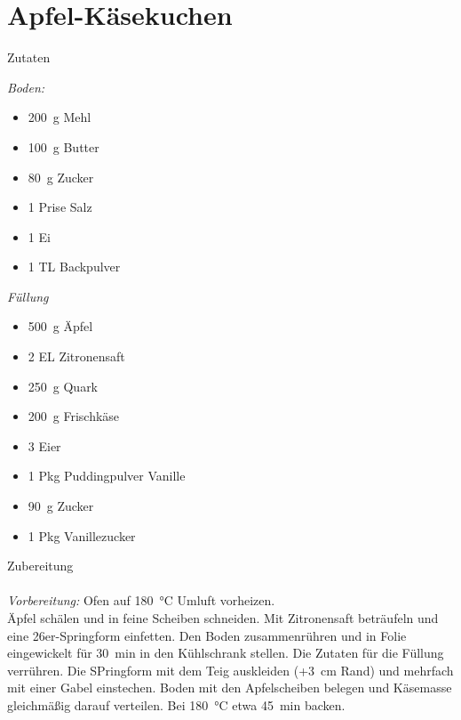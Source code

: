 \section*{Apfel-Käsekuchen}
\ihead{}\ohead{}
\cfoot{}
{\Large Zutaten}
\begin{multicols}{2}
\textit{Boden:}
\begin{itemize}
    \item \SI{200}{g} Mehl
    \item \SI{100}{g} Butter
    \item \SI{80}{g} Zucker
    \item \num{1} Prise Salz
    \item \num{1} Ei
    \item \num{1} TL Backpulver
\end{itemize}
\columnbreak
\textit{Füllung}
\begin{itemize}
    \item \SI{500}{g} Äpfel
    \item \num{2} EL Zitronensaft
    \item \SI{250}{g} Quark
    \item \SI{200}{g} Frischkäse
    \item \num{3} Eier
    \item \num{1} Pkg Puddingpulver Vanille
    \item \SI{90}{g} Zucker
    \item \num{1} Pkg Vanillezucker
\end{itemize}
\end{multicols}
\noindent
{\Large Zubereitung}\\
\\
\textit{Vorbereitung:} Ofen auf \SI{180}{\celsius} Umluft vorheizen.\\
Äpfel schälen und in feine Scheiben schneiden.
Mit Zitronensaft beträufeln und eine \num{26}er-Springform einfetten.
Den Boden zusammenrühren und in Folie eingewickelt für \SI{30}{min} in den Kühlschrank stellen.
Die Zutaten für die Füllung verrühren. Die SPringform mit dem Teig auskleiden (+\SI{3}{cm} Rand) und mehrfach mit einer Gabel einstechen. 
Boden mit den Apfelscheiben belegen und Käsemasse gleichmäßig darauf verteilen.
Bei \SI{180}{\celsius} etwa \SI{45}{min} backen. 
